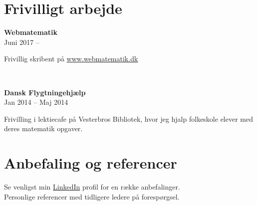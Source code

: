 \documentclass[10pt, a4paper]{article}
\begin{document}
\section{Frivilligt arbejde}
\begin{Row}%
  \begin{Cell}{1}
    \textbf{Webmatematik} \\ [1ex]
    Juni 2017 -- %
  \end{Cell}
  \begin{Cell}{3}
    Frivillig skribent på \href{http://www.webmatematik.dk}{www.webmatematik.dk}
  \end{Cell}
\end{Row}
\\[0.5cm]\begin{Row}%
  \begin{Cell}{1}
    \textbf{Dansk Flygtningehjælp} \\ [1ex]
    Jan 2014 -- Maj 2014 %
  \end{Cell}
  \begin{Cell}{3}
    Frivilling i lektiecafe på Vesterbros Bibliotek, hvor jeg hjalp folkeskole elever
    med deres ma\-te\-ma\-tik opgaver.
  \end{Cell}
\end{Row}


\section{Anbefaling og referencer}
Se venligst min \href{https://dk.linkedin.com/in/carstenjoergensen}{LinkedIn}
profil for en række anbefalinger.
\\[0.25cm]
Personlige referencer med tidligere ledere på forespørgsel.
\end{document}
